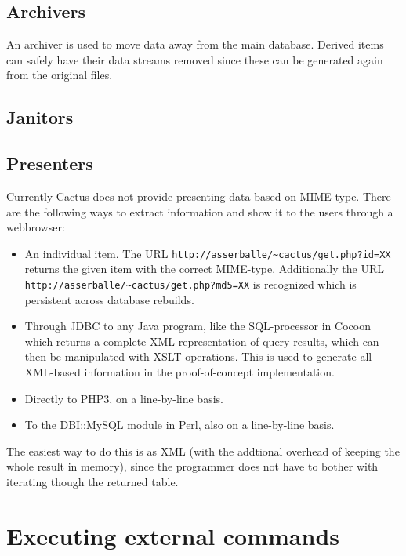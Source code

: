 \subsection{Archivers}

An archiver is used to move data away from the main database.  Derived
items can safely have their data streams removed since these can be
generated again from the original files.  


\subsection{Janitors}



\subsection{Presenters}

Currently Cactus does not provide presenting data based on
MIME-type.  There are the following ways to extract
information and show it to the users through a webbrowser:

\begin{itemize}
\item An individual item.  The URL
  \texttt{http://asserballe/\~{}cactus/get.php?id=XX} returns
  the given item with the correct MIME-type.  Additionally
  the URL \texttt{http://asserballe/\~{}cactus/get.php?md5=XX}
  is recognized which is persistent across database
  rebuilds.
  
\item Through JDBC to any Java program, like the
  SQL-processor in Cocoon which returns a complete
  XML-representation of query results, which can then be
  manipulated with XSLT operations.  This is used to
  generate all XML-based information in the proof-of-concept
  implementation.
  
\item Directly to PHP3, on a line-by-line basis.
\item To the DBI::MySQL module in Perl, also on a
  line-by-line basis.
\end{itemize}

The easiest way to do this is as XML (with the addtional
overhead of keeping the whole result in memory), since the
programmer does not have to bother with iterating though the
returned table. 

\section{Executing external commands}

